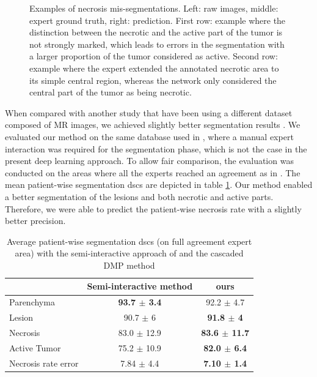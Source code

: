 {\begin{figure}[!ht]
\begin{mdframed}[backgroundcolor=blue!50,linecolor=blue!50]
\begin{minipage}{4cm}
	\end{minipage} 
	\caption{Examples of necrosis mis-segmentations. Left: raw images, middle: expert ground truth, right: prediction. First row: example where the distinction between the necrotic and the active part of the tumor is not strongly marked, which leads to errors in the segmentation with a larger proportion of the tumor considered as active. Second row: example where the expert extended the annotated necrotic area to its simple central region, whereas the network only considered the central part of the tumor as being necrotic.}
	\label{fig:missegmentation_Necrosis_IJCARS}
	\end{mdframed}
\end{figure}
}

When compared with another study that have been using a different dataset composed of MR images, we achieved slightly better segmentation results \cite{Zhang}.
We evaluated our method on the same database used in \cite{Conze2017}, where a manual expert interaction was required for the segmentation phase, which is not the case in the present deep learning approach. To allow fair comparison, the evaluation was conducted on the areas where all the experts reached an agreement as in \cite{Conze2017}. The mean patient-wise segmentation \ac{dsc}s are depicted in table \ref{ComparisionConze}. Our method enabled a better segmentation of the lesions and both necrotic and active parts. Therefore, we were able to predict the patient-wise necrosis rate with a slightly better precision. 

\begin{table}[ht!]
\caption{Average patient-wise segmentation \ac{dsc}s (on full agreement expert area) with the semi-interactive approach of \cite{Conze2017} and the cascaded DMP method}
\begin{tabular}{lcc}
\hline
& Semi-interactive method \cite{Conze2017} & ours \\
\hline
Parenchyma & \textbf{93.7 $\pm$ 3.4} & 92.2 $\pm$ 4.7 \\
Lesion & 90.7 $\pm$ 6 & \textbf{91.8 $\pm$ 4} \\
Necrosis & 83.0 $\pm$ 12.9 & \textbf{83.6 $\pm$ 11.7} \\
Active Tumor & 75.2 $\pm$ 10.9 & \textbf{82.0 $\pm$ 6.4} \\
Necrosis rate error & 7.84 $\pm$ 4.4 & \textbf{7.10 $\pm$ 1.4} \\
\hline
\end{tabular}
\label{ComparisionConze}
\end{table}

